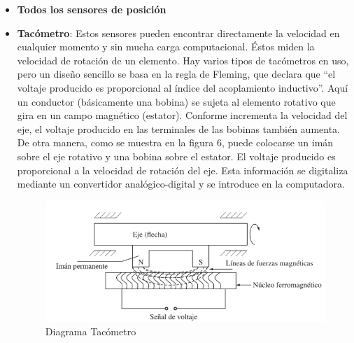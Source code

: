 \begin{itemize}
	\item \textbf{Todos los sensores de posición}
	\item \textbf{Tacómetro}: Estos sensores pueden encontrar directamente la velocidad en cualquier momento y sin mucha carga computacional. Éstos miden la velocidad de rotación de un elemento. Hay varios tipos de tacómetros en uso, pero un diseño sencillo se basa en la regla de Fleming, que declara que “el voltaje producido es proporcional al índice del acoplamiento inductivo”. Aquí un conductor (básicamente una bobina) se sujeta al elemento rotativo que gira en un campo magnético (estator). Conforme incrementa la velocidad del eje, el voltaje producido en las terminales de las bobinas también aumenta. De otra manera, como se muestra en la figura 6, puede colocarse un imán sobre el eje rotativo y una bobina sobre el estator. El voltaje producido es proporcional a la velocidad de rotación del eje. Esta información se digitaliza mediante un convertidor analógico-digital y se introduce en la computadora.
	\begin{figure}[h]
		\centering
		\includegraphics[width=\textwidth]{img/Diagramatacometro.png}
		\caption{Diagrama Tacómetro}
	\end{figure}
	

\end{itemize}
